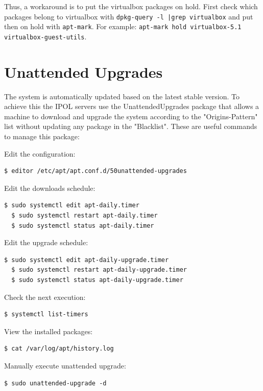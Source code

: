 \documentclass[a4paper,12pt]{article}
\begin{document}
Thus, a workaround is to put the virtualbox packages on hold. First check which packages belong to virtualbox with {\tt dpkg-query -l |grep virtualbox} and put then on hold with {\tt apt-mark}. For example: {\tt apt-mark hold virtualbox-5.1 virtualbox-guest-utils}.

\section{Unattended Upgrades}

The system is automatically updated based on the latest stable version. To achieve this the IPOL servers use the UnattendedUpgrades package that allows a machine to download and upgrade the system according to the "Origins-Pattern" list without updating any package in the "Blacklist". These are useful commands to manage this package: 

Edit the configuration: 
\begin{lstlisting}[firstnumber=1,breaklines]
  $ editor /etc/apt/apt.conf.d/50unattended-upgrades
\end{lstlisting}

Edit the downloads schedule: 
\begin{lstlisting}[firstnumber=1,breaklines]
  $ sudo systemctl edit apt-daily.timer
  $ sudo systemctl restart apt-daily.timer
  $ sudo systemctl status apt-daily.timer
\end{lstlisting}

Edit the upgrade schedule: 
\begin{lstlisting}[firstnumber=1,breaklines]
  $ sudo systemctl edit apt-daily-upgrade.timer
  $ sudo systemctl restart apt-daily-upgrade.timer
  $ sudo systemctl status apt-daily-upgrade.timer
\end{lstlisting}

Check the next execution: 
\begin{lstlisting}[firstnumber=1,breaklines]
  $ systemctl list-timers
\end{lstlisting}

View the installed packages: 
\begin{lstlisting}[firstnumber=1,breaklines]
  $ cat /var/log/apt/history.log
\end{lstlisting}

Manually execute unattended upgrade:
\begin{lstlisting}[firstnumber=1,breaklines]
  $ sudo unattended-upgrade -d
\end{lstlisting}
\end{document}
